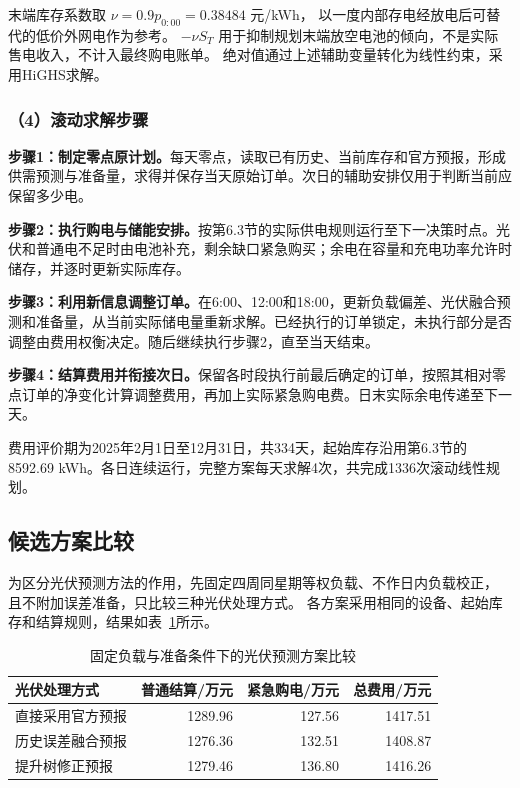 末端库存系数取 $\nu=0.9p_{0:00}=0.38484$ 元/kWh，
以一度内部存电经放电后可替代的低价外网电作为参考。
$-\nu S_T$ 用于抑制规划末端放空电池的倾向，不是实际售电收入，不计入最终购电账单。
绝对值通过上述辅助变量转化为线性约束，采用HiGHS求解。

\subsubsection*{（4）滚动求解步骤}

\noindent\textbf{步骤1：制定零点原计划。}每天零点，读取已有历史、当前库存和官方预报，形成供需预测与准备量，求得并保存当天原始订单。次日的辅助安排仅用于判断当前应保留多少电。

\noindent\textbf{步骤2：执行购电与储能安排。}按第6.3节的实际供电规则运行至下一决策时点。光伏和普通电不足时由电池补充，剩余缺口紧急购买；余电在容量和充电功率允许时储存，并逐时更新实际库存。

\noindent\textbf{步骤3：利用新信息调整订单。}在6:00、12:00和18:00，更新负载偏差、光伏融合预测和准备量，从当前实际储电量重新求解。已经执行的订单锁定，未执行部分是否调整由费用权衡决定。随后继续执行步骤2，直至当天结束。

\noindent\textbf{步骤4：结算费用并衔接次日。}保留各时段执行前最后确定的订单，按照其相对零点订单的净变化计算调整费用，再加上实际紧急购电费。日末实际余电传递至下一天。

费用评价期为2025年2月1日至12月31日，共334天，起始库存沿用第6.3节的8592.69 kWh。各日连续运行，完整方案每天求解4次，共完成1336次滚动线性规划。

\subsection{候选方案比较}

为区分光伏预测方法的作用，先固定四周同星期等权负载、不作日内负载校正，
且不附加误差准备，只比较三种光伏处理方式。
各方案采用相同的设备、起始库存和结算规则，结果如表~\ref{tab:q3_candidate}所示。

\begin{table}[!htbp]
\centering
\caption{固定负载与准备条件下的光伏预测方案比较}
\label{tab:q3_candidate}
\begin{tabular}{lrrr}
\toprule
光伏处理方式 & 普通结算/万元 & 紧急购电/万元 & 总费用/万元\\
\midrule
直接采用官方预报 &1289.96&127.56&1417.51\\
历史误差融合预报 &1276.36&132.51&1408.87\\
提升树修正预报 &1279.46&136.80&1416.26\\
\bottomrule
\end{tabular}
\end{table}

